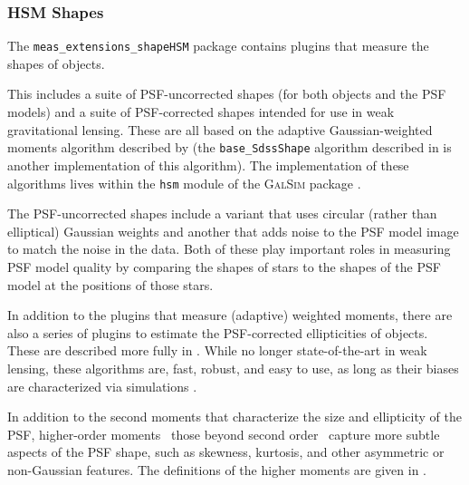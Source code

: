 \subsubsection{HSM Shapes}
\label{sec:hsm}

The \texttt{meas\_extensions\_shapeHSM} package contains plugins that measure the shapes of objects.

This includes a suite of PSF-uncorrected shapes (for both objects and the PSF models) and a suite of PSF-corrected shapes intended for use in weak gravitational lensing.
These are all based on the adaptive Gaussian-weighted moments algorithm described by \citet{2002AJ....123..583B} (the \texttt{base\_SdssShape} algorithm described in  is another implementation of this algorithm).
The implementation of these algorithms lives within the \texttt{hsm} module of the \textsc{GalSim} package \citep{2015A&C....10..121R}.

The PSF-uncorrected shapes include a variant that uses circular (rather than elliptical) Gaussian weights and another that adds noise to the PSF model image to match the noise in the data.
Both of these play important roles in measuring PSF model quality by comparing the shapes of stars to the shapes of the PSF model at the positions of those stars.

In addition to the plugins that measure (adaptive) weighted moments, there are also a series of plugins to estimate the PSF-corrected ellipticities of objects.
These are described more fully \citet{2003MNRAS.343..459H} in \citet{2005MNRAS.361.1287M}.
While no longer state-of-the-art in weak lensing, these algorithms are, fast, robust, and easy to use, as long as their biases are characterized via simulations \citep{2018PASJ...70S..25M, 2022PASJ...74..421L}.

In addition to the second moments that characterize the size and ellipticity of the PSF, higher-order moments \textemdash\ those beyond second order \textemdash\ capture more subtle aspects of the PSF shape, such as skewness, kurtosis, and other asymmetric or non-Gaussian features.
The definitions of the higher moments are given in \citet{2023MNRAS.520.2328Z}.

